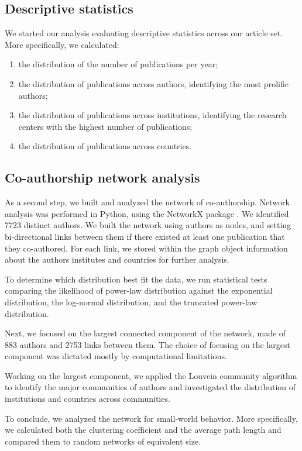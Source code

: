 \documentclass[a4paper, review, endfloat, authoryear]{elsarticle}
\begin{document}
	\subsection{Descriptive statistics}
	We started our analysis evaluating descriptive statistics across our article set. More specifically, we calculated:
	\begin{enumerate}
		\item the distribution of the number of publications per year;
		\item the distribution of publications across authors, identifying the most prolific authors;
		\item the distribution of publications across institutions, identifying the research centers with the highest number of publications;
		\item the distribution of publications across countries.
	\end{enumerate}
	
	\subsection{Co-authorship network analysis}
	As a second step, we built and analyzed the network of co-authorship. Network analysis was performed in Python, using the NetworkX package \citep{hagberg2008exploring}. We identified 7723 distinct authors. We built the network using authors as nodes, and setting bi-directional links between them if there existed at least one publication that they co-authored. For each link, we stored within the graph object information about the authors institutes and countries for further analysis.
	
	To determine which distribution best fit the data, we run statistical tests comparing the likelihood of power-law distribution against the exponential distribution, the log-normal distribution, and the truncated power-law distribution.
	
	Next, we focused on the largest connected component of the network, made of 883 authors and 2753 links between them. The choice of focusing on the largest component was dictated mostly by computational limitations.
	
	Working on the largest component, we applied the Louvein community \citep{blondel2008fast} algorithm to identify the major communities of authors and investigated the distribution of institutions and countries across communities.
	
	To conclude, we analyzed the network for small-world behavior. More specifically, we calculated both the clustering coefficient and the average path length and compared them to random networks of equivalent size.
	
\end{document}
